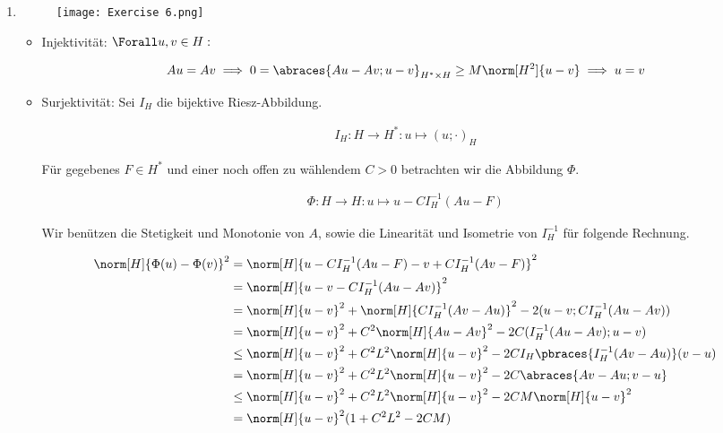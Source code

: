 \begin{solution}

\phantom{}

\begin{enumerate}[label = \textbf{\alph*)}]

  \item \phantom{}
  
  \begin{figure}[h!]
    \centering
    \texttt{[image: Exercise 6.png]}
  \end{figure}
  
  \begin{itemize}
  
    \item Injektivität:
    $\Forall u, v \in H:$

    \begin{align*}
      Au = Av
      \implies
      0 = \abraces{Au - Av; u - v}_{H^\ast \times H} \geq M \norm[H^2]{u -v}
      \implies
      u = v
    \end{align*}

    \item Surjektivität:
    Sei $I_H$ die bijektive Riesz-Abbildung.

    \begin{align*}
      I_H:
      H \to H^\ast:
      u \mapsto (u; \cdot)_H
    \end{align*}

    Für gegebenes $F \in H^\ast$ und einer noch offen zu wählendem $C > 0$ betrachten wir die Abbildung $\Phi$.

    \begin{align*}
      \Phi:
      H \to H:
      u \mapsto u - C I_H^{-1}(Au - F)
    \end{align*}

    Wir benützen die Stetigkeit und Monotonie von $A$, sowie die Linearität und Isometrie von $I_H^{-1}$ für folgende Rechnung.

    \begin{align*}
      \norm[H]{\Phi(u) - \Phi(v)}^2
      & =
      \norm[H]{u - C I_H^{-1}(Au - F) - v + C I_H^{-1}(Av - F)}^2 \\
      & =
      \norm[H]{u - v - C I_H^{-1}(Au - Av)}^2 \\
      & =
      \norm[H]{u - v}^2
      +
      \norm[H]{C I_H^{-1}(Av - Au)}^2
      -
      2 (u - v; C I_H^{-1}(Au - Av)) \\
      & =
      \norm[H]{u - v}^2
      +
      C^2 \norm[H]{Au - Av}^2
      -
      2 C (I_H^{-1}(Au - Av); u - v) \\
      & \leq
      \norm[H]{u - v}^2
      +
      C^2 L^2 \norm[H]{u - v}^2
      -
      2 C I_H \pbraces{I_H^{-1}(Av - Au)}(v - u) \\
      & =
      \norm[H]{u - v}^2
      +
      C^2 L^2 \norm[H]{u - v}^2
      -
      2 C \abraces{Av - Au; v - u} \\
      & \leq
      \norm[H]{u - v}^2
      +
      C^2 L^2 \norm[H]{u - v}^2
      -
      2 C M \norm[H]{u - v}^2 \\
      & =
      \norm[H]{u - v}^2 (1 + C^2 L^2 - 2CM)
    \end{align*}


\end{itemize}
\end{enumerate}
\end{solution}
